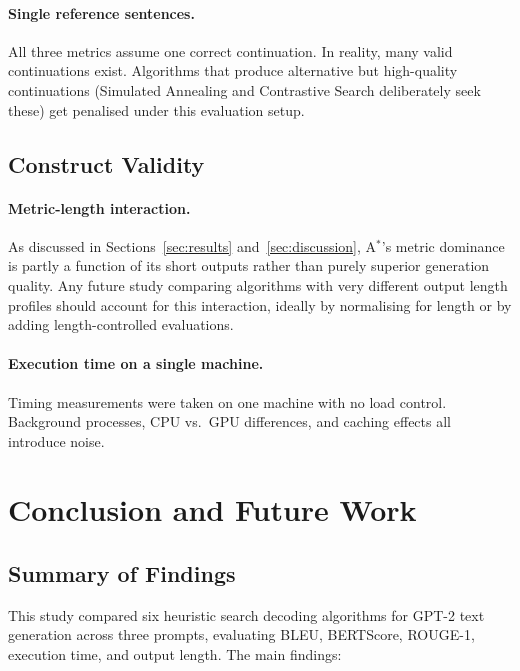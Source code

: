 \documentclass[12pt]{article}
\begin{document}
	\paragraph{Single reference sentences.}
	All three metrics assume one correct continuation. In reality, many valid continuations exist. Algorithms that produce alternative but high-quality continuations (Simulated Annealing and Contrastive Search deliberately seek these) get penalised under this evaluation setup.
	
	\subsection{Construct Validity}
	
	\paragraph{Metric-length interaction.}
	As discussed in Sections~\ref{sec:results} and~\ref{sec:discussion}, A$^*$'s metric dominance is partly a function of its short outputs rather than purely superior generation quality. Any future study comparing algorithms with very different output length profiles should account for this interaction, ideally by normalising for length or by adding length-controlled evaluations.
	
	\paragraph{Execution time on a single machine.}
	Timing measurements were taken on one machine with no load control. Background processes, CPU vs.\ GPU differences, and caching effects all introduce noise.
	
	\section{Conclusion and Future Work}
	\label{sec:conclusion}
	
	\subsection{Summary of Findings}
	
	This study compared six heuristic search decoding algorithms for GPT-2 text generation across three prompts, evaluating BLEU, BERTScore, ROUGE-1, execution time, and output length. The main findings:
	
\end{document}
